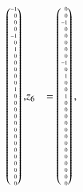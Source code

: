 \begin{beispiel}
{\begin{align*}
\tiny
\begin{pmatrix*}[r]
-1\\
 0\\
 0\\
 0\\
-1\\
 0\\
 1\\
 0\\
 0\\
 0\\
 0\\
 0\\
 1\\
 0\\
 0\\
 0\\
 0\\
 0\\
 0\\
 0\\
 0\\
 0\\
 0\\
 0\\
 0\\
 0\\
 0
\end{pmatrix*},
&z_6 %
&=
\tiny
\begin{pmatrix*}[r]
 0\\
 0\\
-1\\
 0\\
 0\\
 0\\
 0\\
 0\\
-1\\
 0\\
 1\\
 0\\
 0\\
 1\\
 0\\
 0\\
 0\\
 0\\
 0\\
 0\\
 0\\
 0\\
 0\\
 0\\
 0\\
 0\\
 0
\end{pmatrix*},

\end{align*}}
\end{beispiel}
